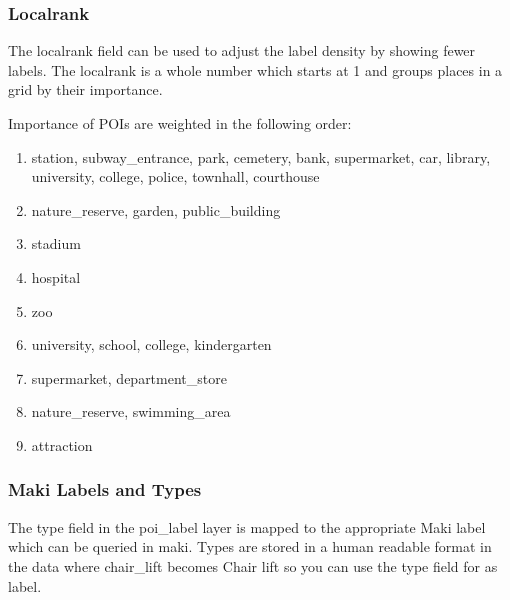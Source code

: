 \subsubsection*{Localrank}\label{localrank}

The localrank field can be used to adjust the label density by showing
fewer labels. The localrank is a whole number which starts at 1 and
groups places in a grid by their importance.

Importance of POIs are weighted in the following order:

\begin{enumerate}
\def\labelenumi{\arabic{enumi}.}
\item
  station, subway\_entrance, park, cemetery, bank, supermarket, car,
  library, university, college, police, townhall, courthouse
\item
  nature\_reserve, garden, public\_building
\item
  stadium
\item
  hospital
\item
  zoo
\item
  university, school, college, kindergarten
\item
  supermarket, department\_store
\item
  nature\_reserve, swimming\_area
\item
  attraction
\end{enumerate}

\subsubsection*{Maki Labels and Types}\label{maki-labels-and-types}

The type field in the poi\_label layer is mapped to the appropriate Maki
label which can be queried in maki. Types are stored in a human readable
format in the data where chair\_lift becomes Chair lift so you can use
the type field for as label.
